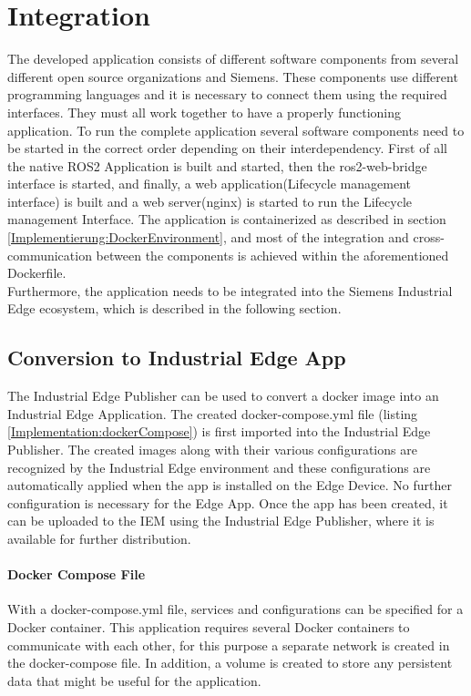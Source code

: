 \section{Integration}
\label{Implementierung:Integration}
The developed application consists of different software components from several different open source organizations and Siemens. These components use different programming languages and it is necessary to connect them using the required interfaces. They must all work together to have a properly functioning application. To run the complete application several software components need to be started in the correct order depending on their interdependency. First of all the native ROS2 Application is built and started, then the ros2-web-bridge interface is started, and finally, a web application(Lifecycle management interface) is built and a web server(nginx) is started to run the Lifecycle management Interface. The application is containerized as described in section \ref{Implementierung:DockerEnvironment}, and most of the integration and cross-communication between the components is achieved within the aforementioned Dockerfile. 
\\ 

Furthermore, the application needs to be integrated into the Siemens Industrial Edge ecosystem, which is described in the following section.
\subsection{Conversion to Industrial Edge App} 
The Industrial Edge Publisher can be used to convert a docker image into an Industrial Edge Application. The created docker-compose.yml file (listing \ref{Implementation:dockerCompose}) is first imported into the Industrial Edge Publisher. The created images along with their various configurations are recognized by the Industrial Edge environment and these configurations are automatically applied when the app is installed on the Edge Device. No further configuration is necessary for the Edge App. Once the app has been created, it can be uploaded to the IEM using the Industrial Edge Publisher, where it is available for further distribution.

\paragraph{Docker Compose File}
With a docker-compose.yml file, services and configurations can be specified for a Docker container. This application requires several Docker containers to communicate with each other, for this purpose a separate network is created in the docker-compose file. In addition, a volume is created to store any persistent data that might be useful for the application.
\\

